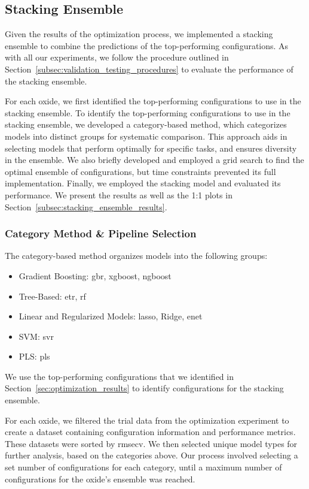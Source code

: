 \subsection{Stacking Ensemble}\label{subsec:stacking_ensemble}
Given the results of the optimization process, we implemented a stacking ensemble to combine the predictions of the top-performing configurations.
As with all our experiments, we follow the procedure outlined in Section~\ref{subsec:validation_testing_procedures} to evaluate the performance of the stacking ensemble.

For each oxide, we first identified the top-performing configurations to use in the stacking ensemble.
To identify the top-performing configurations to use in the stacking ensemble, we developed a category-based method, which categorizes models into distinct groups for systematic comparison.
This approach aids in selecting models that perform optimally for specific tasks, and ensures diversity in the ensemble.
We also briefly developed and employed a grid search to find the optimal ensemble of configurations, but time constraints prevented its full implementation.
Finally, we employed the stacking model and evaluated its performance.
We present the results as well as the 1:1 plots in Section~\ref{subsec:stacking_ensemble_results}.

\subsubsection{Category Method \& Pipeline Selection}\label{subsec:category_method}
The category-based method organizes models into the following groups:

\begin{itemize}
    \item Gradient Boosting: \gls{gbr}, \gls{xgboost}, \gls{ngboost}
    \item Tree-Based: \gls{etr}, \gls{rf}
    \item Linear and Regularized Models: \gls{lasso}, Ridge, \gls{enet}
    \item SVM: \gls{svr}
    \item PLS: \gls{pls}
\end{itemize}

We use the top-performing configurations that we identified in Section~\ref{sec:optimization_results} to identify configurations for the stacking ensemble.

For each oxide, we filtered the trial data from the optimization experiment to create a dataset containing configuration information and performance metrics.
These datasets were sorted by \gls{rmsecv}.
We then selected unique model types for further analysis, based on the categories above.
Our process involved selecting a set number of configurations for each category, until a maximum number of configurations for the oxide's ensemble was reached.

